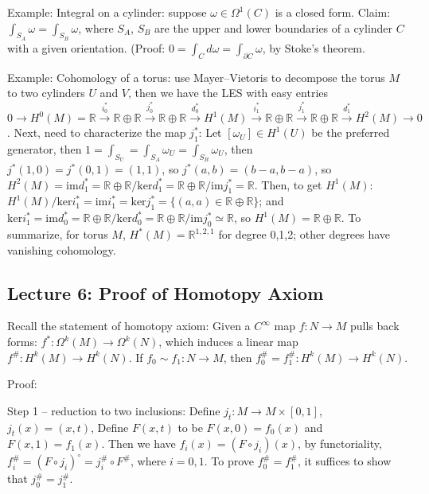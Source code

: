 \documentclass{article}
\theoremstyle{mystyle}
\theoremstyle{remark}
\numberwithin{equation}{section}
\begin{document}
Example: Integral on a cylinder: suppose $\omega \in \Omega^1(C)$ is a closed form. Claim: $\int_{S_A}\omega = \int_{S_B}\omega$, where $S_A$, $S_B$ are the upper and lower boundaries of a cylinder $C$ with a given orientation. (Proof: $0=\int_Cd\omega = \int_{\partial C} \omega$, by Stoke's theorem.

Example: Cohomology of a torus: use Mayer--Vietoris to decompose the torus $M$ to two cylinders $U$ and $V$, then we have the LES with easy entries $0\rightarrow H^0(M)=\mathbb{R}\xrightarrow {i_0^*}\mathbb{R}\oplus \mathbb{R}\xrightarrow{j_0^*}\mathbb{R}\oplus \mathbb{R}\xrightarrow{d_0^*} H^1(M)\xrightarrow {i_1^*}\mathbb{R}\oplus \mathbb{R}\xrightarrow {j_1^*} \mathbb{R}\oplus \mathbb{R} \xrightarrow{d_1^*} H^2(M)\rightarrow 0$. Next, need to characterize the map $j_1^*$: Let $[\omega_U]\in H^1(U)$ be the preferred generator, then $1 = \int_{S_U} = \int_{S_A}\omega_U = \int_{S_B} \omega_U$, then $j^*(1,0) =j^*(0,1)= (1,1)$, so $j^*(a,b)=(b-a,b-a)$, so $H^2(M) = \mathrm{im}d^*_1 = \mathbb{R}\oplus \mathbb{R}/\mathrm{ker}d_1^* = \mathbb{R}\oplus \mathbb{R}/\mathrm{im}j_1^* = \mathbb{R}$. Then, to get $H^1(M)$: $H^1(M)/\mathrm{ker}i_1^* = \mathrm{im}i_1^* = \mathrm{ker}j_1^* = \{(a,a)\in \mathbb{R}\oplus \mathbb{R}\}$; and $\mathrm{ker}i_1^* = \mathrm{im}d_0^*
=\mathbb{R}\oplus\mathbb{R}/\mathrm{ker}d_0^* = \mathbb{R}\oplus\mathbb{R}/\mathrm{im}j_0^*\simeq \mathbb{R}$, so $H^1(M) = \mathbb{R}\oplus \mathbb{R}$. To summarize, for torus $M$, $H^*(M) = \mathbb{R}^{1,2,1}$ for degree 0,1,2; other degrees have vanishing cohomology.

\subsection{Lecture 6: Proof of Homotopy Axiom}

Recall the statement of homotopy axiom: Given a $C^\infty$ map $f\colon N\rightarrow M$ pulls back forms: $f^*\colon \Omega^k(M)\rightarrow \Omega^k(N)$, which induces a linear map $f^\#\colon H^k(M)\rightarrow H^k(N)$. If $f_0\sim f_1\colon N\rightarrow M$, then $f_0^\# = f_1^\#\colon H^k(M)\rightarrow H^k(N)$. 

Proof: 

Step 1 -- reduction to two inclusions: Define $j_t\colon M\rightarrow M\times [0,1]$, $j_t(x) = (x,t)$, Define $F(x,t)$ to be $F(x,0)=f_0(x)$ and $F(x,1)= f_1(x)$. Then we have $f_i(x) = (F\circ j_i)(x)$, by functoriality, $f_i^\# = (F\circ j_i)^\circ = j_i^\#\circ F^\#$, where $i=0,1$. To prove $f_0^\#=f_1^\#$, it suffices to show that $j_0^\# = j_1^\#$. 
\end{document}
